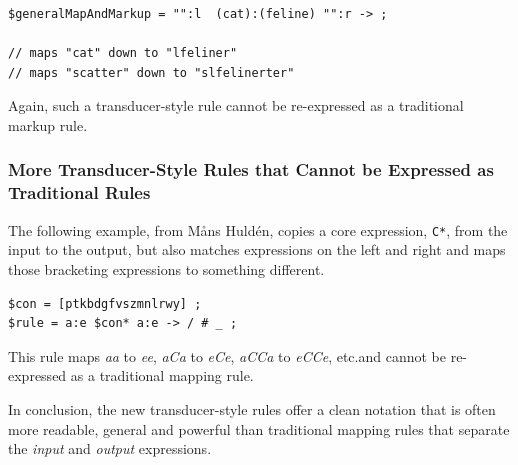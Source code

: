 \begin{Verbatim}
$generalMapAndMarkup = "":l  (cat):(feline) "":r -> ;

// maps "cat" down to "lfeliner"
// maps "scatter" down to "slfelinerter"
\end{Verbatim}

\noindent
Again, such a transducer-style rule cannot be re-expressed as a traditional markup rule.

\subsubsection{More Transducer-Style Rules that Cannot be Expressed as
Traditional Rules}

The following example, from M\r{a}ns Huldén, copies a core expression, \verb!C*!, from the
input to the output, but also matches expressions on the left and right and maps those
bracketing expressions to something different.

\begin{Verbatim}
$con = [ptkbdgfvszmnlrwy] ;
$rule = a:e $con* a:e -> / # _ ;
\end{Verbatim}

\noindent
This rule maps \emph{aa} to \emph{ee}, \emph{aCa} to \emph{eCe}, \emph{aCCa}
to \emph{eCCe}, etc.\@ and cannot be re-expressed as a traditional mapping rule.

In conclusion, the new transducer-style rules offer a clean notation that is often more
readable, general and powerful than traditional mapping rules that separate the \emph{input}
and \emph{output} expressions.  
